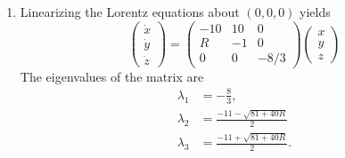 \begin{Solution}
  \begin{enumerate}
  \item
    Linearizing the Lorentz equations about $(0,0,0)$ yields 
    \[ 
    \begin{pmatrix}
      \dot{x} \\
      \dot{y} \\
      \dot{z}
    \end{pmatrix}
    =
    \begin{pmatrix}
      -10     & 10    & 0     \\
      R       & -1    & 0     \\
      0       & 0     & -8/3
    \end{pmatrix}
    \begin{pmatrix}
      x \\
      y \\
      z
    \end{pmatrix}
    \]
    The eigenvalues of the matrix are
    \begin{align*}
      \lambda_1 &= -\frac{8}{3}, \\
      \lambda_2 &= \frac{-11-\sqrt{81+40R}}{2} \\
      \lambda_3 &= \frac{-11+\sqrt{81+40R}}{2} .
    \end{align*}


\end{enumerate}
\end{Solution}
